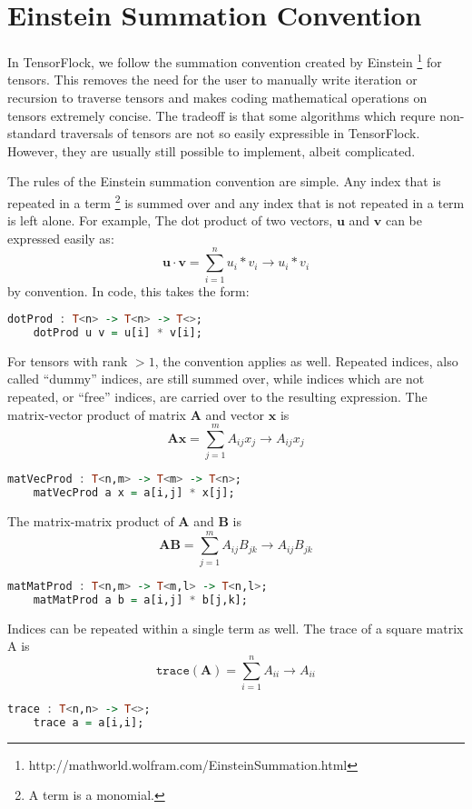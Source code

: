 \section{Einstein Summation Convention}%
\label{sec:einstein_summation_convention}

In TensorFlock, we follow the summation convention created by Einstein
\footnote{http://mathworld.wolfram.com/EinsteinSummation.html} 
for tensors. This removes the need for the user to manually write iteration or
recursion to traverse tensors and makes coding mathematical operations on
tensors extremely concise. The tradeoff is that some algorithms which requre
non-standard traversals of tensors are not so easily expressible in
TensorFlock. However, they are usually still possible to implement, albeit
complicated. 

The rules of the Einstein summation convention are simple. 
Any index that is repeated in a term \footnote{A term is a monomial.}  
is summed over and any index that is not repeated in a term is left alone.
For example, The dot product of two vectors, $\mathbf{u}$ and $\mathbf{v}$
can be expressed easily as: 
\[\mathbf{u} \cdot \mathbf{v} = \sum^{n}_{i=1} u_i * v_i \rightarrow u_i * v_i\] by
convention. In code, this takes the form:
\begin{lstlisting}[language=haskell]
    dotProd : T<n> -> T<n> -> T<>;
    dotProd u v = u[i] * v[i];
\end{lstlisting}

For tensors with rank $> 1$, the convention applies as well. Repeated indices,
also called ``dummy'' indices, are still summed over, while indices which are
not repeated, or ``free'' indices, are carried over to the resulting
expression. The matrix-vector product of matrix $\mathbf{A}$ and vector
$\mathbf{x}$ is  
\[ \mathbf{A} \mathbf{x} = \sum^{m}_{j=1} A_{ij} x_j \rightarrow A_{ij} x_j \]
\begin{lstlisting}[language=haskell]
    matVecProd : T<n,m> -> T<m> -> T<n>;
    matVecProd a x = a[i,j] * x[j];
\end{lstlisting}

The matrix-matrix product of $ \mathbf{A} $ and $ \mathbf{B} $ is 
\[ \mathbf{A} \mathbf{B} = \sum^{m}_{j=1} A_{ij} B_{jk} 
   \rightarrow A_{ij} B_{jk} \]
\begin{lstlisting}[language=haskell]
    matMatProd : T<n,m> -> T<m,l> -> T<n,l>;
    matMatProd a b = a[i,j] * b[j,k];
\end{lstlisting}

Indices can be repeated within a single term as well. The trace of a square
matrix A is \[ \texttt{trace}( \mathbf{A} ) = \sum^{n}_{i=1} A_{ii} \rightarrow A_{ii}\] 
\begin{lstlisting}[language=haskell]
    trace : T<n,n> -> T<>;
    trace a = a[i,i];
\end{lstlisting}

